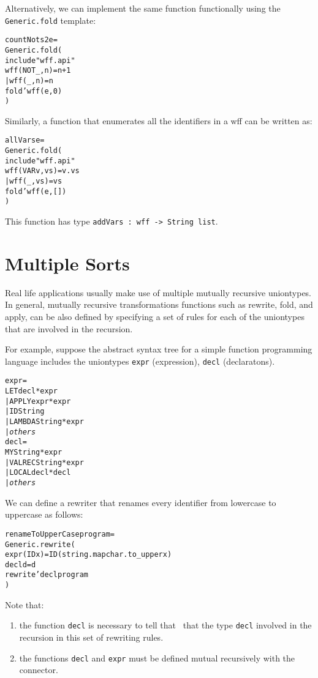 Alternatively, we can implement the same function 
functionally using the \verb|Generic.fold| template:
\begin{alltt}
   \FUN countNots2 e = 
       Generic.fold(
       \LET include "wff.api"
           \FUN wff (NOT _, n) = n+1
             | wff (_, n) = n
       \IN  fold'wff(e, 0)
       \END)
\end{alltt}

Similarly, a function that enumerates all the identifiers in a wff
can be written as:
\begin{alltt}
   \FUN allVars e = 
       Generic.fold(
       \LET include "wff.api"
           \FUN wff (VAR v, vs) = v . vs
             | wff (_, vs) = vs
       \IN  fold'wff(e, [])
       \END)
\end{alltt}
This function has type \verb|addVars : wff -> String list|.

\section{Multiple Sorts}

   Real life applications usually make use of multiple
mutually recursive uniontypes.  In general, mutually recursive
transformations functions such as rewrite, fold, and apply, can be also defined  
by specifying a set of rules for each of the uniontypes that are involved
in the recursion.  

   For example, suppose the abstract syntax tree  
for a simple function programming language includes 
the uniontypes \verb|expr| (expression), 
\verb|decl| (declaratons).

\begin{alltt}
  \UNIONTYPE expr = 
    LET \OF decl * expr
  | APPLY \OF expr * expr
  | ID \OF String
  | LAMBDA \OF String * expr
  | {\em others}
  \AND decl = 
    MY \OF String * expr
  | VALREC \OF String * expr
  | LOCAL \OF decl * decl
  | {\em others}
\end{alltt}

We can define a rewriter that renames every identifier 
from lowercase to uppercase as follows:
\begin{alltt}
   \FUN renameToUpperCase program =  
   Generic.rewrite(
        \FUN expr (ID x) = ID(string.map char.to_upper x)
        \AND decl d      = d
   \IN  rewrite'decl program
   \END
   )
\end{alltt}

Note that:
\begin{enumerate}
  \item the function \verb|decl| is necessary to tell that 
\RewriteGen\ that the type \verb|decl| involved in the recursion
in this set of rewriting rules.
  \item the functions \verb|decl| and \verb|expr| must be defined 
        mutual recursively with the \AND{} connector.
\end{enumerate}

